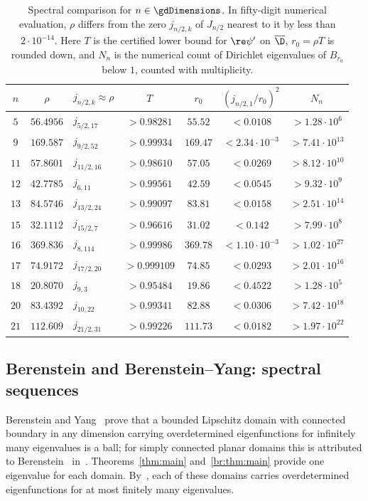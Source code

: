 \begin{table}[ht]
\centering\footnotesize
\begin{tabular}{@{}cclcccc@{}}
\toprule
$n$ & $\rho$ & $j_{n/2,k}\approx\rho$ & $T$ & $r_0$ & $(j_{n/2,1}/r_0)^2$ & $N_n$\\
\midrule
$5$ & $56.4956$ & $j_{5/2,17}$ & $>0.98281$ & $55.52$ & $<0.0108$ & $>1.28\cdot10^{6}$ \\
$9$ & $169.587$ & $j_{9/2,52}$ & $>0.99934$ & $169.47$ & $<2.34\cdot10^{-3}$ & $>7.41\cdot10^{13}$ \\
$11$ & $57.8601$ & $j_{11/2,16}$ & $>0.98610$ & $57.05$ & $<0.0269$ & $>8.12\cdot10^{10}$ \\
$12$ & $42.7785$ & $j_{6,11}$ & $>0.99561$ & $42.59$ & $<0.0545$ & $>9.32\cdot10^{9}$ \\
$13$ & $84.5746$ & $j_{13/2,24}$ & $>0.99097$ & $83.81$ & $<0.0158$ & $>2.51\cdot10^{14}$ \\
$15$ & $32.1112$ & $j_{15/2,7}$ & $>0.96616$ & $31.02$ & $<0.142$ & $>7.99\cdot10^{8}$ \\
$16$ & $369.836$ & $j_{8,114}$ & $>0.99986$ & $369.78$ & $<1.10\cdot10^{-3}$ & $>1.02\cdot10^{27}$ \\
$17$ & $74.9172$ & $j_{17/2,20}$ & $>0.999109$ & $74.85$ & $<0.0293$ & $>2.01\cdot10^{16}$ \\
$18$ & $20.8070$ & $j_{9,3}$ & $>0.95484$ & $19.86$ & $<0.4522$ & $>1.28\cdot10^{5}$ \\
$20$ & $83.4392$ & $j_{10,22}$ & $>0.99341$ & $82.88$ & $<0.0306$ & $>7.42\cdot10^{18}$ \\
$21$ & $112.609$ & $j_{21/2,31}$ & $>0.99226$ & $111.73$ & $<0.0182$ & $>1.97\cdot10^{22}$ \\
\bottomrule
\end{tabular}
\caption{Spectral comparison for $n\in\gdRigDimensions$. In fifty-digit numerical evaluation, $\rho$ differs from the zero $j_{n/2,k}$ of $J_{n/2}$ nearest to it by less than $2\cdot10^{-14}$. Here $T$ is the certified lower bound for $\re\psi'$ on $\overline\D$, $r_0=\rho T$ is rounded down, and $N_n$ is the numerical count of Dirichlet eigenvalues of $B_{r_0}$ below $1$, counted with multiplicity.}\label{tab:rig-spec}
\end{table}


\subsection{Berenstein and Berenstein--Yang: spectral sequences}
Berenstein and Yang~\cite{BY87} prove that a bounded Lipschitz domain with connected boundary in any dimension carrying overdetermined eigenfunctions for infinitely many eigenvalues is a ball; for simply connected planar domains this is attributed to Berenstein~\cite{Ber80} in~\cite[\S0]{BY87}. Theorems~\ref{thm:main} and~\ref{br:thm:main} provide one eigenvalue for each domain. By~\cite{BY87}, each of these domains carries overdetermined eigenfunctions for at most finitely many eigenvalues.

